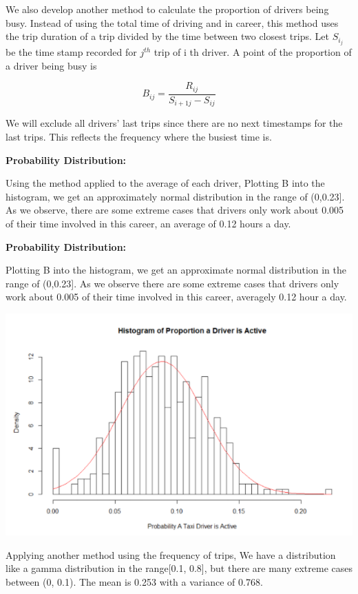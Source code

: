 \documentclass[11pt]{article}
\begin{document}
\par
 We also develop another method to calculate the proportion of drivers being busy. Instead of using the total
 time of driving and in career, this method uses the trip duration of a trip divided by the time between two closest
 trips. Let $S_{i_j}$ be the time stamp recorded for $j^{th}$ trip of i th driver. A point of the proportion of a driver
 being busy is

\begin{equation}
B_{ij} = \frac{R_{ij}}{S_{i+1 j}-S_{ij}}
\end{equation}

\par
We will exclude all drivers' last trips since there are no next timestamps for the last trips.
 This reflects the frequency where the busiest time is. 

\noindent\textbf{Probability Distribution:}
\par
Using the method applied to the average of each driver, Plotting B into the histogram, we get an approximately
 normal distribution in the range of (0,0.23]. As we observe, there are some extreme cases that drivers only
 work about 0.005 of their time involved in this career, an average of 0.12 hours a day. 

\textbf{Probability Distribution:}
\par
Plotting B into the histogram, we get an approximate normal distribution in the range of (0,0.23]. As we observe there are some extreme cases that drivers only work about 0.005 of their time involved in this career, averagely 0.12 hour a day.

\noindent\includegraphics{Hist(PropActDriv).png}\\
\par
Applying another method using the frequency of trips, We have a distribution like a gamma distribution in the
 range[0.1, 0.8], but there are many extreme cases between (0, 0.1). The mean is 0.253 with a variance of 0.768.
\end{document}
